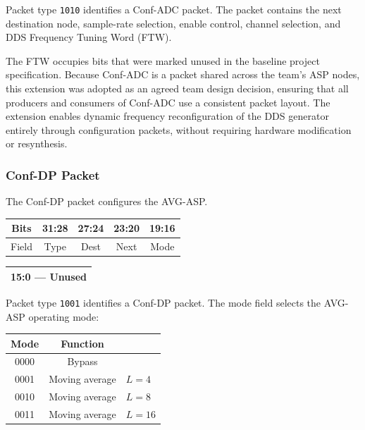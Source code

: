 \documentclass[10pt, a4paper]{article}
\begin{document}
Packet type \texttt{1010} identifies a Conf-ADC packet. The packet contains the next destination node, sample-rate selection, enable control, channel selection, and DDS Frequency Tuning Word (FTW).

The FTW occupies bits that were marked unused in the baseline project specification. Because Conf-ADC is a packet shared across the team's ASP nodes, this extension was adopted as an agreed team design decision, ensuring that all producers and consumers of Conf-ADC use a consistent packet layout. The extension enables dynamic frequency reconfiguration of the DDS generator entirely through configuration packets, without requiring hardware modification or resynthesis.

\subsubsection*{Conf-DP Packet}

The Conf-DP packet configures the AVG-ASP.

\begin{center}
\begin{tabular}{|c|c|c|c|c|}
    \hline
    Bits & 31:28 & 27:24 & 23:20 & 19:16 \\ \hline
    Field & Type & Dest & Next & Mode \\ \hline
\end{tabular}

\vspace{0.3cm}

\begin{tabular}{|c|}
    \hline
    15:0 --- Unused \\ \hline
\end{tabular}
\end{center}

Packet type \texttt{1001} identifies a Conf-DP packet. The mode field selects the AVG-ASP operating mode:

\begin{center}
\begin{tabular}{|c|cl|}
    \hline
    \textbf{Mode} & \textbf{Function} & \\
    \hline
    0000          & Bypass            & \\ \hline
    0001          & Moving average    & $L=4$ \\ \hline
    0010          & Moving average    & $L=8$ \\ \hline
    0011          & Moving average    & $L=16$ \\
    \hline
\end{tabular}
\end{center}
\end{document}
